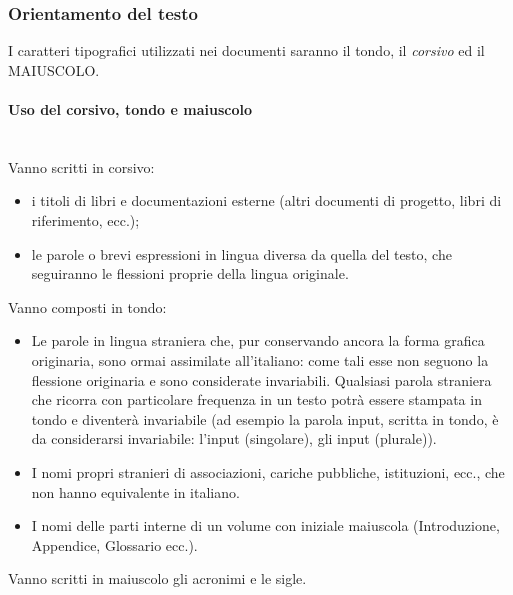 \subsubsection{Orientamento del testo}
I caratteri tipografici utilizzati nei documenti saranno il tondo, il \textit{corsivo} ed il MAIUSCOLO.

\paragraph{Uso del corsivo, tondo e maiuscolo} \mbox{} \\
Vanno scritti in corsivo:
\begin{itemize}
	\item i titoli di libri e documentazioni esterne (altri documenti di progetto, libri di riferimento, ecc.);
	\item le parole o brevi espressioni in lingua diversa da quella del testo, che seguiranno le flessioni proprie della lingua originale.
\end{itemize}
Vanno composti in tondo:
\begin{itemize}
	\item Le parole in lingua straniera che, pur conservando ancora la forma grafica originaria, sono ormai assimilate all'italiano: come tali esse non seguono la flessione originaria e sono considerate invariabili. Qualsiasi parola straniera che ricorra con particolare frequenza in un testo potrà essere stampata in tondo e diventerà invariabile (ad esempio la parola input, scritta in tondo, è da considerarsi invariabile: l'input (singolare), gli input (plurale)).
	\item I nomi propri stranieri di associazioni, cariche pubbliche, istituzioni, ecc., che non hanno equivalente in italiano.
	\item I nomi delle parti interne di un volume con iniziale maiuscola (Introduzione, Appendice, Glossario ecc.).
\end{itemize}
Vanno scritti in maiuscolo gli acronimi e le sigle.

